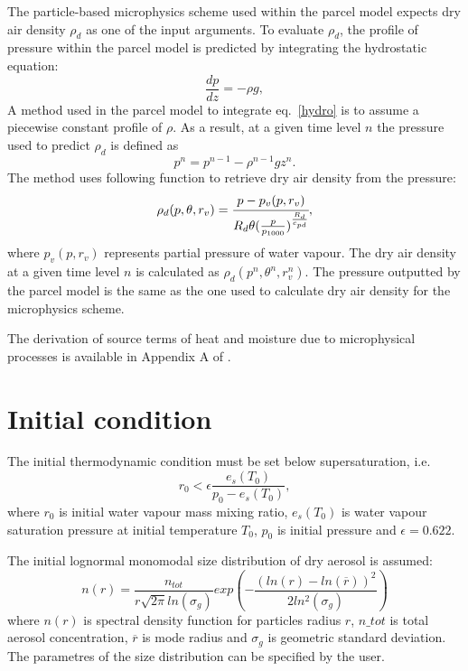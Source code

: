 \documentclass[11pt]{article}
\begin{document}
The particle-based microphysics scheme used within the parcel model expects dry air density $\rho_d$ as one of the input arguments.
To evaluate $\rho_d$, the profile of pressure within the parcel model is predicted by integrating the hydrostatic equation:
\begin{equation}
	\frac{dp}{dz} = -\rho g,
	\label{hydro}
\end{equation}
A method used in the parcel model to integrate eq.~\ref{hydro} is to assume a piecewise constant profile of $\rho$. 
As a result, at a given time level $n$ the pressure used to predict $\rho_d$ is defined as
  \begin{equation*}
    p^n = p^{n-1} - \rho^{n-1} g z^n .
  \end{equation*}
\noindent
The method uses following function to retrieve dry air density from the pressure:
\begin{equation}
  \rho_{d}(p, \theta, r_v) = \cfrac{p - p_v(p, r_v)}{ R_d \theta (\frac{p}{p_{1000}})^{\frac{R_d}{c_{pd}}}},
  \label{rho}
\end{equation}
\noindent
where $p_v(p, r_v)$ represents partial pressure of water vapour.
The dry air density at a given time level $n$ is calculated as $\rho_d(p^n, \theta^n, r_v^n)$. 
The pressure outputted by the parcel model is the same as the one used to calculate dry air density for the microphysics scheme.


The derivation of source terms of heat and moisture due to microphysical processes 
  is available in Appendix A of \citep{Arabas_et_al_2015}.


\section{Initial condition}

The initial thermodynamic condition must be set below supersaturation, i.e.
\begin{equation}
	r_0 < \epsilon \frac{e_s(T_0)}{p_0 - e_s(T_0)},
\end{equation}
\noindent
where $r_0$ is initial water vapour mass mixing ratio, $e_s(T_0)$ is water vapour saturation pressure at initial temperature $T_0$, $p_0$ is initial pressure and $\epsilon = 0.622$.

The initial lognormal monomodal size distribution of dry aerosol is assumed:
\begin{equation}
        n(r) = \frac{n_{tot}}{r\sqrt{2\pi}ln(\sigma_g)}exp(-\frac{(ln(r)-ln(\overline{r}))^2}{2ln^2(\sigma_g)})
        \label{lognormalny}
\end{equation}
\noindent
where $n(r)$ is spectral density function for particles radius $r$, $n\_tot$ is total aerosol concentration, $\overline{r}$ is mode radius and $\sigma_g$ is geometric standard deviation.
The parametres of the size distribution can be specified by the user.
\end{document}
